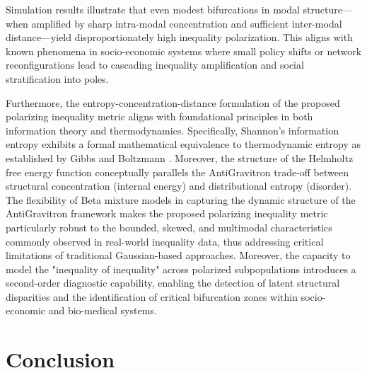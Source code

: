 \documentclass[11pt]{article}
\begin{document}
Simulation results illustrate that even modest bifurcations in modal structure---when amplified by sharp intra-modal concentration and sufficient inter-modal distance---yield disproportionately high inequality polarization. This aligns with known phenomena in socio-economic systems where small policy shifts or network reconfigurations lead to cascading inequality amplification and social stratification into poles. 


Furthermore, the entropy-concentration-distance formulation of the proposed polarizing inequality metric aligns with foundational principles in both information theory and thermodynamics. Specifically, Shannon’s information entropy exhibits a formal mathematical equivalence to thermodynamic entropy as established by Gibbs and Boltzmann \citep{shannon1948mathematical, gibbs1902elementary}. Moreover, the structure of the Helmholtz free energy function \citep{helmholtz1882thermodynamics} conceptually parallels the AntiGravitron trade-off between structural concentration (internal energy) and distributional entropy (disorder). The flexibility of Beta mixture models in capturing the dynamic structure of the AntiGravitron framework makes the proposed polarizing inequality metric particularly robust to the bounded, skewed, and multimodal characteristics commonly observed in real-world inequality data, thus addressing critical limitations of traditional Gaussian-based approaches. Moreover, the capacity to model the "inequality of inequality" across polarized subpopulations introduces a second-order diagnostic capability, enabling the detection of latent structural disparities and the identification of critical bifurcation zones within socio-economic and bio-medical systems.

\section{Conclusion}
\end{document}
